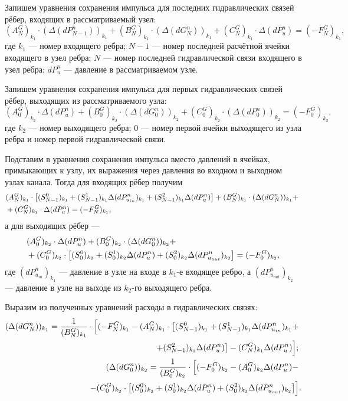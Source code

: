 Запишем уравнения сохранения импульса для последних гидравлических связей рёбер, входящих в рассматриваемый узел:
\begin{equation}
\label{formula625}
(A_N^G)_{k_1} \cdot (\Delta(dP_{N-1}^n))_{k_1}+(B_N^G)_{k_1} \cdot (\Delta(dG_N^n))_{k_1} + (C_N^G)_{k_1} \cdot \Delta(dP_u^n)  = (-F_N^G)_{k_1}, 
\end{equation}
где $k_1$ --- номер входящего ребра; $N-1$ --- номер последней расчётной ячейки входящего в узел ребра; $N$ --- номер последней гидравлической связи входящего в узел ребра; $dP_u^n$ --- давление в рассматриваемом узле.

Запишем уравнения сохранения импульса для первых гидравлических связей рёбер, выходящих из рассматриваемого узла:
\begin{equation}
\label{formula626}
(A_0^G)_{k_2} \cdot \Delta(dP_u^n)+(B_0^G)_{k_2} \cdot (\Delta(dG_0^n))_{k_2} + (C_0^G)_{k_2} \cdot (\Delta(dP_0^n))_{k_2}  = (-F_0^G)_{k_2}, 
\end{equation}  
где $k_2$ --- номер выходящего ребра; $0$ --- номер первой ячейки выходящего из узла ребра и номер первой гидравлической связи.

Подставим в уравнения сохранения импульса вместо давлений в ячейках, примыкающих к узлу, их выражения через давления во входном и выходном узлах канала. Тогда для входящих рёбер получим
\begin{align}
\label{formula627}
&(A_N^G)_{k_1} \cdot \left[(S_{N-1}^0)_{k_1} + (S_{N-1}^1)_{k_1} \Delta(dP_{u_{in}}^n)_{k_1} + (S_{N-1}^2)_{k_1} \Delta(dP_u^n)\right]+(B_N^G)_{k_1} \cdot (\Delta(dG_N^n))_{k_1}+\notag ~\\
& + (C_N^G)_{k_1} \cdot \Delta(dP_u^n) = (-F_N^G)_{k_1}, 
\end{align}
а для выходящих рёбер ---
\begin{align}
\label{formula628}
&(A_0^G)_{k_2} \cdot \Delta(dP_u^n)+(B_0^G)_{k_2} \cdot (\Delta(dG_0^n))_{k_2} + \notag ~\\
& + (C_0^G)_{k_2} \cdot \left[(S_0^0)_{k_2} + (S_0^1)_{k_2} \Delta(dP_u^n) + (S_0^2)_{k_2} \Delta(dP_{u_{out}}^n)_{k_2}\right]  = (-F_0^G)_{k_2}, 
\end{align}
где $(dP_{u_{in}}^n)_{k_1}$ --- давление в узле на входе в $k_1$-е входящее ребро, а $(dP_{u_{out}}^n)_{k_2}$ --- давление в узле на выходе из $k_2$-го выходящего ребра. 

Выразим из полученных уравнений расходы в гидравлических связях:
\begin{align}
\label{formula629}
(\Delta(dG_N^n))_{k_1} = \frac{1}{(B_N^G)_{k_1}}\cdot \Big[
(-F_N^G)_{k_1}-(A_N^G)_{k_1}\cdot \big[(S_{N-1}^0)_{k_1} + (S_{N-1}^1)_{k_1} \Delta(dP_{u_{in}}^n)_{k_1} + \notag ~\\
+ (S_{N-1}^2)_{k_1} \Delta(dP_u^n)\big] - (C_N^G)_{k_1} \Delta(dP_u^n)\Big]; \notag ~\\
(\Delta(dG_0^n))_{k_2} = \frac{1}{(B_0^G)_{k_2}}\cdot \Big[(-F_0^G)_{k_2} - (A_0^G)_{k_2} \Delta(dP_u^n) - \notag ~\\
- (C_0^G)_{k_2}\cdot \big[(S_0^0)_{k_2} + (S_0^1)_{k_2} \Delta(dP_u^n) + (S_0^2)_{k_2} \Delta(dP_{u_{out}}^n)_{k_2}\big] \Big].
\end{align}

